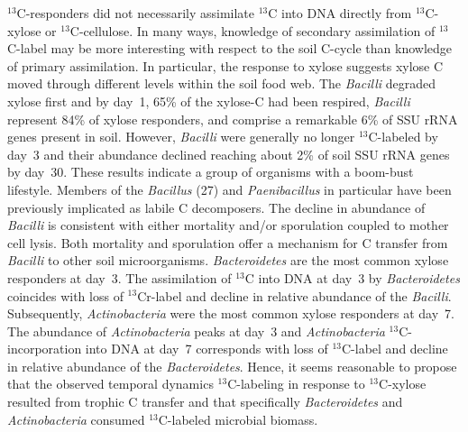 $^{13}$C-responders did not necessarily assimilate $^{13}$C into DNA directly
from $^{13}$C-xylose or $^{13}$C-cellulose. In many ways, knowledge of
secondary assimilation of $^{13}$C-label may be more interesting with respect
to the soil C-cycle than knowledge of primary assimilation. In particular, the
response to xylose suggests xylose C moved through different levels within the
soil food web. The \textit{Bacilli} degraded xylose first and by day~1, 65\% of
the xylose-C had been respired, \textit{Bacilli} represent 84\% of xylose
responders, and comprise a remarkable 6\% of SSU rRNA genes present in soil.
However, \textit{Bacilli} were generally no longer $^{13}$C-labeled by day~3
and their abundance declined reaching about 2\% of soil SSU rRNA genes by
day~30. These results indicate a group of organisms with a boom-bust
lifestyle. Members of the \textit{Bacillus} \citep{}(27) and \textit{Paenibacillus} in
particular \citep{Verastegui_2014} have been previously implicated as labile C decomposers. The
decline in abundance of \textit{Bacilli} is consistent with either mortality
and/or sporulation coupled to mother cell lysis. Both mortality and sporulation
offer a mechanism for C transfer from \textit{Bacilli} to other soil
microorganisms. \textit{Bacteroidetes} are the most common xylose responders at
day~3. The assimilation of  $^{13}$C into DNA at day~3 by
\textit{Bacteroidetes} coincides with loss of $^{13}$Cr-label and decline in
relative abundance of the \textit{Bacilli}. Subsequently,
\textit{Actinobacteria} were the most common xylose responders at day~7. The
abundance of \textit{Actinobacteria} peaks at day~3 and \textit{Actinobacteria}
$^{13}$C-incorporation into DNA at day~7 corresponds with loss of
$^{13}$C-label and decline in relative abundance of the \textit{Bacteroidetes}.
Hence, it seems reasonable to propose that the observed temporal dynamics
$^{13}$C-labeling in response to $^{13}$C-xylose resulted from trophic
C transfer and that specifically \textit{Bacteroidetes} and
\textit{Actinobacteria} consumed $^{13}$C-labeled microbial biomass. 

